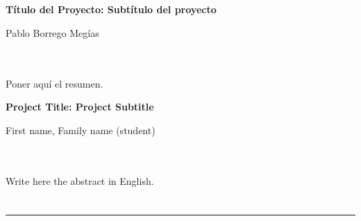 \chapter*{}


%



\cleardoublepage
\thispagestyle{empty}

\begin{center}
{\large\bfseries Título del Proyecto: Subtítulo del proyecto}\\
\end{center}
\begin{center}
Pablo Borrego Megías \\
\end{center}

\\

\vspace{0.7cm}
\\

Poner aquí el resumen.
\cleardoublepage


\thispagestyle{empty}


\begin{center}
{\large\bfseries Project Title: Project Subtitle}\\
\end{center}
\begin{center}
First name, Family name (student)\\
\end{center}

\\

\vspace{0.7cm}
\\

Write here the abstract in English.

\chapter*{}
\thispagestyle{empty}

\noindent\rule[-1ex]{\textwidth}{2pt}\\[4.5ex]

